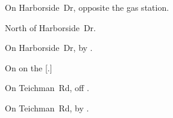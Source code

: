 
\begin{LocationList}

On  Harborside~Dr, opposite the gas station.

North of  Harborside~Dr.

\Location{\GasStation \Gas \Rest}
On  Harborside~Dr, by  .

On  on the [.]

On Teichman~Rd, off  .

\Location{\TruckService \Service}
On Teichman~Rd, by  .

\end{LocationList}
